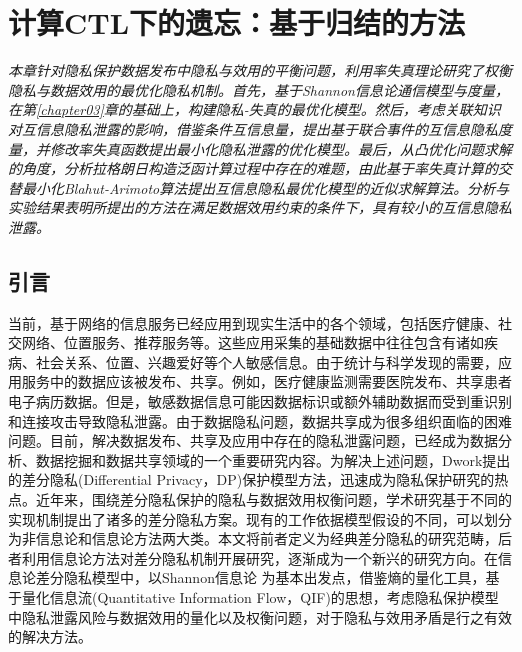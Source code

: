 \chapter{计算CTL下的遗忘：基于归结的方法}\label{chapter04}
{\em 本章针对隐私保护数据发布中隐私与效用的平衡问题，利用率失真理论研究了权衡隐私与数据效用的最优化隐私机制。首先，基于Shannon信息论通信模型与度量，在第\ref{chapter03}章的基础上，构建隐私-失真的最优化模型。然后，考虑关联知识对互信息隐私泄露的影响，借鉴条件互信息量，提出基于联合事件的互信息隐私度量，并修改率失真函数提出最小化隐私泄露的优化模型。最后，从凸优化问题求解的角度，分析拉格朗日构造泛函计算过程中存在的难题，由此基于率失真计算的交替最小化Blahut-Arimoto算法提出互信息隐私最优化模型的近似求解算法。分析与实验结果表明所提出的方法在满足数据效用约束的条件下，具有较小的互信息隐私泄露。}

\section{引言}

当前，基于网络的信息服务已经应用到现实生活中的各个领域，包括医疗健康、社交网络、位置服务、推荐服务等。这些应用采集的基础数据中往往包含有诸如疾病、社会关系、位置、兴趣爱好等个人敏感信息。由于统计与科学发现的需要，应用服务中的数据应该被发布、共享。例如，医疗健康监测需要医院发布、共享患者电子病历数据。但是，敏感数据信息可能因数据标识或额外辅助数据而受到重识别和连接攻击导致隐私泄露\cite{sweeney2002k}。由于数据隐私问题，数据共享成为很多组织面临的困难问题。目前，解决数据发布、共享及应用中存在的隐私泄露问题，已经成为数据分析、数据挖掘和数据共享领域的一个重要研究内容。为解决上述问题，Dwork提出的差分隐私\cite{dwork2006differential,dwork2006calibrating,dwork2008differential,dwork2014algorithmic,dwork2015the}(Differential Privacy，DP)保护模型方法，迅速成为隐私保护研究的热点\cite{zhu2017differentially,zhangxiaojian2014,zhu2017differentially}。近年来，围绕差分隐私保护的隐私与数据效用权衡问题，学术研究基于不同的实现机制\cite{mcsherry2007mechanism,dwork2008differential,ghosh2012universally}提出了诸多的差分隐私方案。现有的工作依据模型假设的不同\cite{sarwate2014a}，可以划分为非信息论和信息论方法两大类。本文将前者定义为经典差分隐私的研究范畴，后者利用信息论方法对差分隐私机制开展研究，逐渐成为一个新兴的研究方向。在信息论差分隐私模型中，以Shannon信息论\cite{shannon1948a} 为基本出发点，借鉴熵的量化工具，基于量化信息流\cite{smith2009on,alvim2011on,boreale2015quantitative,alvim2015on}(Quantitative Information Flow，QIF)的思想，考虑隐私保护模型中隐私泄露风险与数据效用的量化以及权衡问题，对于隐私与效用矛盾是行之有效的解决方法。


